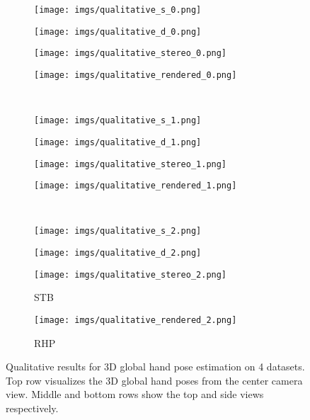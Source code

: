 \documentclass[10pt,twocolumn,letterpaper]{article}
\begin{document}
\begin{figure*}[t]
  \begin{subfigure}[t]{0.29283019\linewidth}
    \texttt{[image: imgs/qualitative\_s\_0.png]}
  \end{subfigure}
  \begin{subfigure}[t]{0.29283019\linewidth}
    \texttt{[image: imgs/qualitative\_d\_0.png]}
  \end{subfigure}
  \begin{subfigure}[t]{0.21962264\linewidth}
    \texttt{[image: imgs/qualitative\_stereo\_0.png]}
  \end{subfigure}
  \begin{subfigure}[t]{0.16471698\linewidth}
    \texttt{[image: imgs/qualitative\_rendered\_0.png]}
  \end{subfigure}\\
  \begin{subfigure}[t]{0.29283019\linewidth}
    \texttt{[image: imgs/qualitative\_s\_1.png]}
  \end{subfigure}
  \begin{subfigure}[t]{0.29283019\linewidth}
    \texttt{[image: imgs/qualitative\_d\_1.png]}
  \end{subfigure}
  \begin{subfigure}[t]{0.21962264\linewidth}
    \texttt{[image: imgs/qualitative\_stereo\_1.png]}
  \end{subfigure}
  \begin{subfigure}[t]{0.16471698\linewidth}
    \texttt{[image: imgs/qualitative\_rendered\_1.png]}
  \end{subfigure}\\
  \begin{subfigure}[t]{0.29283019\linewidth}
    \texttt{[image: imgs/qualitative\_s\_2.png]}
    \caption{}\label{fig:qualitative_ego_s}
  \end{subfigure}
  \begin{subfigure}[t]{0.29283019\linewidth}
    \texttt{[image: imgs/qualitative\_d\_2.png]}
    \caption{}\label{fig:qualitative_ego_d}
  \end{subfigure}
  \begin{subfigure}[t]{0.21962264\linewidth}
    \texttt{[image: imgs/qualitative\_stereo\_2.png]}
    \caption{STB}\label{fig:qualitative_stb}
  \end{subfigure}
  \begin{subfigure}[t]{0.16471698\linewidth}
    \texttt{[image: imgs/qualitative\_rendered\_2.png]}
    \caption{RHP}\label{fig:qualitative_rhp}
  \end{subfigure}
  \vspace{0.2cm}
  \caption{Qualitative results for 3D global hand pose estimation on 4 datasets. Top row visualizes the 3D global hand poses from the center camera view. Middle and bottom rows show the top and side views respectively.}
  \label{fig:qualitative_results}
\end{figure*}
\end{document}
